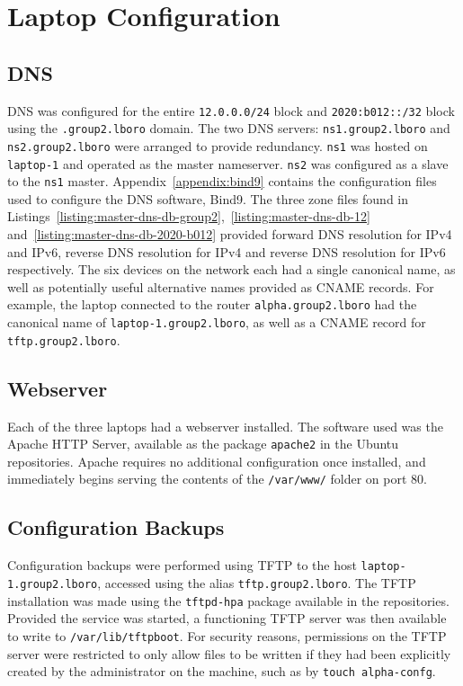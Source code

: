 \chapter{Laptop Configuration}
\section{DNS}
    DNS was configured for the entire \texttt{12.0.0.0/24} block and \texttt
    {2020:b012::/32} block using the \texttt{.group2.lboro} domain. The two DNS
    servers: \texttt{ns1.group2.lboro} and \texttt{ns2.group2.lboro} were
    arranged to provide redundancy.
    \texttt{ns1} was hosted on \texttt{laptop-1} and operated as the master
    nameserver. \texttt{ns2} was configured as a slave to the \texttt{ns1}
    master. Appendix~\ref{appendix:bind9} contains the configuration files used
    to configure the DNS software, Bind9. The three zone files found in
    Listings~\ref {listing:master-dns-db-group2},~\ref{listing:master-dns-db-12} and~\ref {listing:master-dns-db-2020-b012} provided forward DNS
    resolution for IPv4 and IPv6, reverse DNS resolution for IPv4 and reverse
    DNS resolution for IPv6 respectively. The six devices on the network each
    had a single canonical name, as well as potentially useful alternative
    names provided as CNAME records. For example, the laptop connected to the
    router \texttt{alpha.group2.lboro} had the canonical name of
    \texttt{laptop-1.group2.lboro}, as well as a CNAME record for
    \texttt{tftp.group2.lboro}.
\section{Webserver}
    Each of the three laptops had a webserver installed. The software used was
    the Apache HTTP Server, available as the package \texttt{apache2} in the
    Ubuntu repositories. Apache requires no additional configuration once
    installed, and immediately begins serving the contents of the \texttt
    {/var/www/} folder on port 80.
\section{Configuration Backups}
    Configuration backups were performed using TFTP to the host \texttt
    {laptop-1.group2.lboro}, accessed using the alias \texttt
    {tftp.group2.lboro}. The TFTP installation was made using the \texttt
    {tftpd-hpa} package available in the repositories. Provided the service was
    started, a functioning TFTP server was then available to write to \texttt
    {/var/lib/tftpboot}. For security reasons, permissions on the TFTP server
    were restricted to only allow files to be written if they had been
    explicitly created by the administrator on the machine, such as by
    \texttt{touch alpha-confg}.
